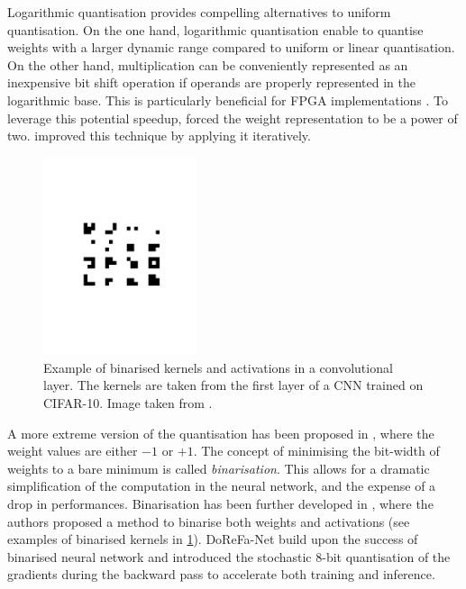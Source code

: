Logarithmic quantisation provides compelling alternatives to uniform
quantisation. On the one hand, logarithmic quantisation enable to quantise
weights with a larger dynamic range compared to uniform or linear quantisation.
On the other hand, multiplication can be conveniently represented as an
inexpensive bit shift operation if operands are properly represented in the
logarithmic base. This is particularly beneficial for \ac{FPGA} implementations
\cite{alemdar2017ternary}. To leverage this potential speedup,
\cite{DBLP:journals/corr/LinCMB15} forced the weight representation to be a
power of two. \cite{DBLP:conf/iclr/ZhouYGXC17} improved this technique by
applying it iteratively.\\


\begin{figure}[htbp]
    \centering
    \includegraphics[width=0.40\textwidth,trim=5cm 9cm 5cm 9cm, clip]{chapter_sota/assets/binarised_kernels.pdf}
    \caption{Example of binarised kernels and activations in a convolutional
    layer. The kernels are taken from the first layer of a \ac{CNN} trained on CIFAR-10.
    Image taken from \cite{DBLP:conf/nips/HubaraCSEB16}.}
    \label{fig:sota:binarised_kernels}
\end{figure}

A more extreme version of the quantisation has been proposed in
\cite{courbariaux2015binaryconnect}, where the weight values are either $-1$ or
$+1$. The concept of minimising the bit-width of weights to a bare minimum is
called \emph{binarisation}. This allows for a dramatic simplification of the
computation in the neural network, and the expense of a drop in performances.
Binarisation has been further developed in \cite{DBLP:conf/nips/HubaraCSEB16},
where the authors proposed a method to binarise both weights and activations
(see examples of binarised kernels in \cref{fig:sota:binarised_kernels}).
DoReFa-Net \cite{zhou2016dorefa} build upon the success of binarised neural
network and introduced the stochastic 8-bit quantisation of the gradients during
the backward pass to accelerate both training and inference.\\

